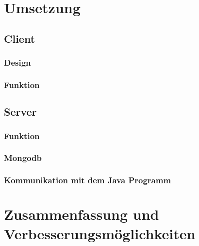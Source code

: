 \section{Umsetzung}

\subsection{Client}

\subsubsection{Design}

\subsubsection{Funktion}

\subsection{Server}

\subsubsection{Funktion}

\subsubsection{Mongodb}

\subsubsection{Kommunikation mit dem Java Programm}

\section{Zusammenfassung und Verbesserungsmöglichkeiten}